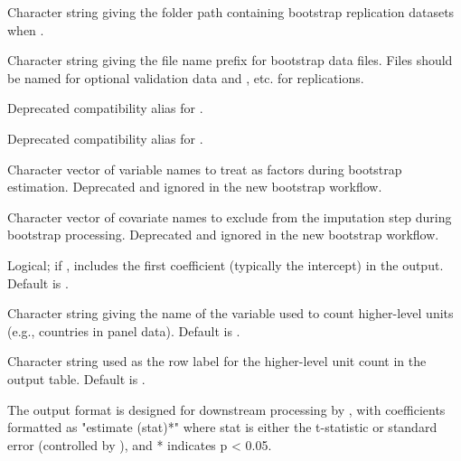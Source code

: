 \documentclass[a4paper]{book}
\begin{document}
\begin{Arguments}
\begin{ldescription}
\item[\code{bootstrap\_dir}] Character string giving the folder path containing
bootstrap replication datasets when .

\item[\code{bootstrap\_prefix}] Character string giving the file name prefix for
bootstrap data files. Files should be named
 for optional validation data and
, etc. for replications.

\item[\code{bootDataLocation}] Deprecated compatibility alias for
.

\item[\code{bootDataNameTag}] Deprecated compatibility alias for
.

\item[\code{bootFactorVars}] Character vector of variable names to treat as factors
during bootstrap estimation. Deprecated and ignored in the new bootstrap
workflow.

\item[\code{bootExcludeCovars}] Character vector of covariate names to exclude from
the imputation step during bootstrap processing. Deprecated and ignored in
the new bootstrap workflow.

\item[\code{keepCoef1}] Logical; if , includes the first coefficient
(typically the intercept) in the output. Default is .

\item[\code{superunit\_covariateName}] Character string giving the name of the variable
used to count higher-level units (e.g., countries in panel data). Default
is .

\item[\code{superunit\_label}] Character string used as the row label for the
higher-level unit count in the output table. Default is .
\end{ldescription}
\end{Arguments}
%
\begin{Details}
The output format is designed for downstream processing by ,
with coefficients formatted as "estimate (stat)*" where stat is either the
t-statistic or standard error (controlled by ), and * indicates
p < 0.05.
\end{Details}
\end{document}
